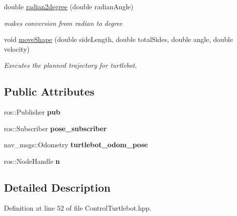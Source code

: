 \begin{DoxyCompactItemize}
double \hyperlink{class_control_turtlebot_ac20a23af7bd0978dd47b9dc5a0e0b880}{radian2degree} (double radian\+Angle)
\begin{DoxyCompactList}\small\item\em makes conversion from radian to degree \end{DoxyCompactList}\item 
void \hyperlink{class_control_turtlebot_ac23a9389982e796ddb302ea158d370d6}{move\+Shape} (double side\+Length, double total\+Sides, double angle, double velocity)
\begin{DoxyCompactList}\small\item\em Executes the planned trajectory for turtlebot. \end{DoxyCompactList}\end{DoxyCompactItemize}
\subsection*{Public Attributes}
\begin{DoxyCompactItemize}
\item 
ros\+::\+Publisher {\bfseries pub}\hypertarget{class_control_turtlebot_a9334d4337499cdde728423b9e2c95152}{}\label{class_control_turtlebot_a9334d4337499cdde728423b9e2c95152}

\item 
ros\+::\+Subscriber {\bfseries pose\+\_\+subscriber}\hypertarget{class_control_turtlebot_a3f70b9134199b02477917d404c6046ce}{}\label{class_control_turtlebot_a3f70b9134199b02477917d404c6046ce}

\item 
nav\+\_\+msgs\+::\+Odometry {\bfseries turtlebot\+\_\+odom\+\_\+pose}\hypertarget{class_control_turtlebot_a34fe24732253b38c4eaead6d9ecc0405}{}\label{class_control_turtlebot_a34fe24732253b38c4eaead6d9ecc0405}

\item 
ros\+::\+Node\+Handle {\bfseries n}\hypertarget{class_control_turtlebot_a7aba89f4135d80c5973fe6e923f56176}{}\label{class_control_turtlebot_a7aba89f4135d80c5973fe6e923f56176}

\end{DoxyCompactItemize}


\subsection{Detailed Description}


Definition at line 52 of file Control\+Turtlebot.\+hpp.



